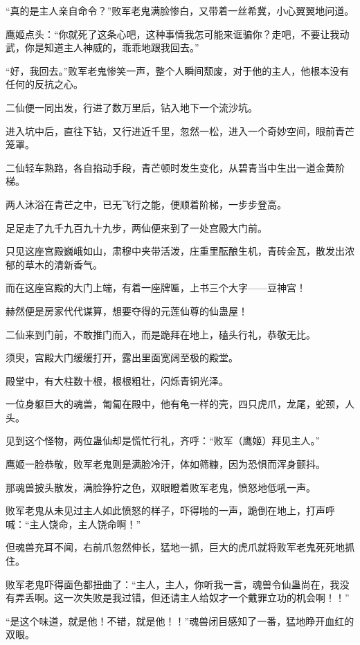 \begin{this_body}
“真的是主人亲自命令？”败军老鬼满脸惨白，又带着一丝希冀，小心翼翼地问道。

鹰姬点头：“你就死了这条心吧，这种事情我怎可能来诓骗你？走吧，不要让我动武，你是知道主人神威的，乖乖地跟我回去。”

“好，我回去。”败军老鬼惨笑一声，整个人瞬间颓废，对于他的主人，他根本没有任何的反抗之心。

二仙便一同出发，行进了数万里后，钻入地下一个流沙坑。

进入坑中后，直往下钻，又行进近千里，忽然一松，进入一个奇妙空间，眼前青芒笼罩。

二仙轻车熟路，各自掐动手段，青芒顿时发生变化，从碧青当中生出一道金黄阶梯。

两人沐浴在青芒之中，已无飞行之能，便顺着阶梯，一步步登高。

足足走了九千九百九十九步，两仙便来到了一处宫殿大门前。

只见这座宫殿巍峨如山，肃穆中夹带活泼，庄重里酝酿生机，青砖金瓦，散发出浓郁的草木的清新香气。

而在这座宫殿的大门上端，有着一座牌匾，上书三个大字——豆神宫！

赫然便是房家代代谋算，想要夺得的元莲仙尊的仙蛊屋！

二仙来到门前，不敢推门而入，而是跪拜在地上，磕头行礼，恭敬无比。

须臾，宫殿大门缓缓打开，露出里面宽阔至极的殿堂。

殿堂中，有大柱数十根，根根粗壮，闪烁青铜光泽。

一位身躯巨大的魂兽，匍匐在殿中，他有龟一样的壳，四只虎爪，龙尾，蛇颈，人头。

见到这个怪物，两位蛊仙却是慌忙行礼，齐呼：“败军（鹰姬）拜见主人。”

鹰姬一脸恭敬，败军老鬼则是满脸冷汗，体如筛糠，因为恐惧而浑身颤抖。

那魂兽披头散发，满脸狰狞之色，双眼瞪着败军老鬼，愤怒地低吼一声。

败军老鬼从未见过主人如此愤怒的样子，吓得啪的一声，跪倒在地上，打声呼喊：“主人饶命，主人饶命啊！”

但魂兽充耳不闻，右前爪忽然伸长，猛地一抓，巨大的虎爪就将败军老鬼死死地抓住。

败军老鬼吓得面色都扭曲了：“主人，主人，你听我一言，魂兽令仙蛊尚在，我没有弄丢啊。这一次失败是我过错，但还请主人给奴才一个戴罪立功的机会啊！！”

“是这个味道，就是他！不错，就是他！！”魂兽闭目感知了一番，猛地睁开血红的双眼。


\end{this_body}
